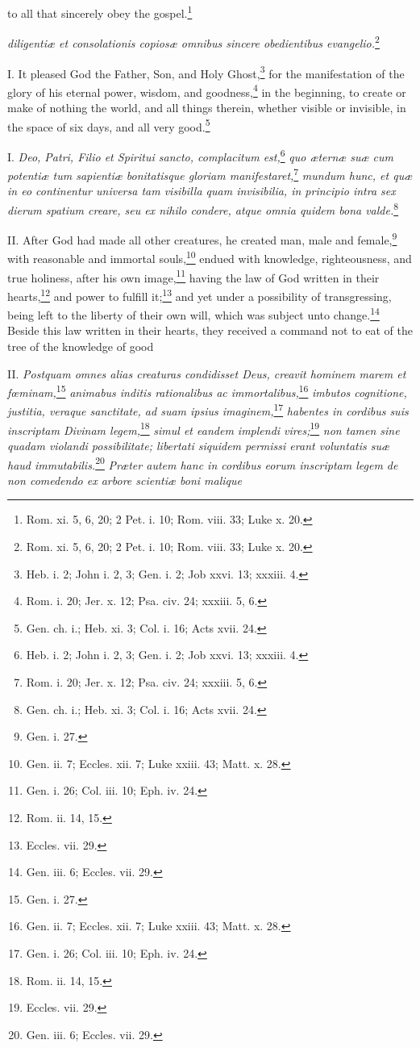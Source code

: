 to all that sincerely obey the gospel.\footnote{Rom. xi. 5, 6, 20; 2 Pet. i. 10; Rom. viii. 33; Luke x. 20.}

\emph{diligentiæ et consolationis copiosæ omnibus sincere obedientibus evangelio.}\footnote{Rom. xi. 5, 6, 20; 2 Pet. i. 10; Rom. viii. 33; Luke x. 20.}


I. It pleased God the Father, Son, and Holy Ghost,\footnote{Heb. i. 2; John i. 2, 3; Gen. i. 2; Job xxvi. 13; xxxiii. 4.} for the manifestation of the glory of his eternal power, wisdom, and goodness,\footnote{Rom. i. 20; Jer. x. 12; Psa. civ. 24; xxxiii. 5, 6.} in the beginning, to create or make of nothing the world, and all things therein, whether visible or invisible, in the space of six days, and all very good.\footnote{Gen. ch. i.; Heb. xi. 3; Col. i. 16; Acts xvii. 24.}

I. \emph{Deo, Patri, Filio et Spiritui sancto, complacitum est,}\footnote{Heb. i. 2; John i. 2, 3; Gen. i. 2; Job xxvi. 13; xxxiii. 4.}\emph{ quo æternæ suæ cum potentiæ tum sapientiæ bonitatisque gloriam manifestaret,}\footnote{Rom. i. 20; Jer. x. 12; Psa. civ. 24; xxxiii. 5, 6.}\emph{ mundum hunc, et quæ in eo continentur universa tam visibilla quam invisibilia, in principio intra sex dierum spatium creare, seu ex nihilo condere, atque omnia quidem bona valde.}\footnote{Gen. ch. i.; Heb. xi. 3; Col. i. 16; Acts xvii. 24.}

II. After God had made all other creatures, he created man, male and female,\footnote{Gen. i. 27.} with reasonable and immortal souls,\footnote{Gen. ii. 7; Eccles. xii. 7; Luke xxiii. 43; Matt. x. 28.} endued with knowledge, righteousness, and true holiness, after his own image,\footnote{Gen. i. 26; Col. iii. 10; Eph. iv. 24.} having the law of God written in their hearts,\footnote{Rom. ii. 14, 15.} and power to fulfill it;\footnote{Eccles. vii. 29.} and yet under a possibility of transgressing, being left to the liberty of their own will, which was subject unto change.\footnote{Gen. iii. 6; Eccles. vii. 29.} Beside this law written in their hearts, they received a command not to eat of the tree of the knowledge of good

II. \emph{Postquam omnes alias creaturas condidisset Deus, creavit hominem marem et fœminam,}\footnote{Gen. i. 27.}\emph{ animabus inditis rationalibus ac immortalibus,}\footnote{Gen. ii. 7; Eccles. xii. 7; Luke xxiii. 43; Matt. x. 28.}\emph{ imbutos cognitione, justitia, veraque sanctitate, ad suam ipsius imaginem,}\footnote{Gen. i. 26; Col. iii. 10; Eph. iv. 24.}\emph{ habentes in cordibus suis inscriptam Divinam legem,}\footnote{Rom. ii. 14, 15.}\emph{ simul et eandem implendi vires;}\footnote{Eccles. vii. 29.}\emph{ non tamen sine quadam violandi possibilitate; libertati siquidem permissi erant voluntatis suæ haud immutabilis.}\footnote{Gen. iii. 6; Eccles. vii. 29.}\emph{ Præter autem hanc in cordibus eorum inscriptam legem de non comedendo ex arbore scientiæ boni malique }

